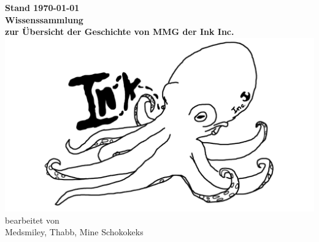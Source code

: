 \documentclass[a4paper,DIV=calc,11pt,%
BCOR=3mm,twoside,headsepline,%
numbers=noenddot,%
bibliography=totoc%
]{scrreprt}
\begin{document}
\begin{titlepage}
	
	
	\centering
	\vfil
	\Large{\textbf{Stand {\today}}} \\ \bigskip
	\vfil
	\textsf{\textbf{\Huge{Wissenssammlung}}} \\ \bigskip
	\Large{\textbf{zur Übersicht der Geschichte von MMG der Ink Inc.}} \\
	\vfil
	\includegraphics[width=\linewidth]{Abbildungen/logo.png}
	\vfil
	\large
	bearbeitet von\\
	Medsmiley, Thabb, Mine Schokokeks
\end{titlepage}


\tableofcontents









\end{document}
